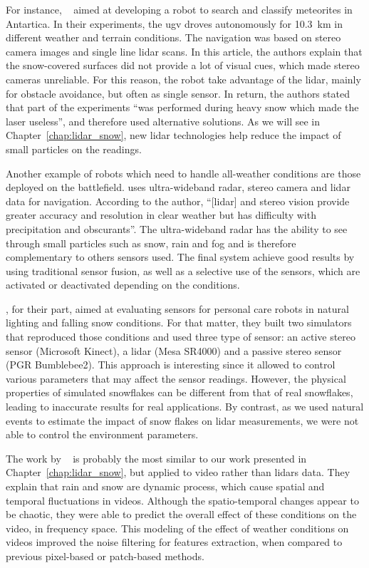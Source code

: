 For instance, ~\citet{Moorehead_1999_2122} aimed at developing a robot to search and classify meteorites in Antartica. In their experiments, the \gls*{ugv} droves autonomously for \SI{10.3}{\kilo\meter} in different weather and terrain conditions. The navigation was based on stereo camera images and single line \gls*{lidar} scans. In this article, the authors explain that the snow-covered surfaces did not provide a lot of visual cues, which made stereo cameras unreliable. For this reason, the robot take advantage of the \gls*{lidar}, mainly for obstacle avoidance, but often as single sensor. In return, the authors stated that part of the experiments \enquote{was performed during heavy snow which made the laser useless}, and therefore used alternative solutions. As we will see in Chapter~\ref{chap:lidar_snow}, new \gls*{lidar} technologies help reduce the impact of small particles on the readings. 

Another example of robots which need to handle all-weather conditions are those deployed on the battlefield. \citet{yamauchi2010fusing} uses ultra-wideband radar, stereo camera and \gls*{lidar} data for navigation. According to the author, \enquote{[\gls*{lidar}] and stereo vision provide greater accuracy and resolution in clear weather but has difficulty with precipitation and obscurants}. The ultra-wideband radar has the ability to see through small particles such as snow, rain and fog and is therefore complementary to others sensors used. The final system achieve good results by using traditional sensor fusion, as well as a selective use of the sensors, which are activated or deactivated depending on the conditions. 

\citet{sumi-arso-13}, for their part, aimed at evaluating sensors for personal care robots in natural lighting and falling snow conditions. For that matter, they built two simulators that reproduced those conditions and used three type of sensor: an active stereo sensor (Microsoft Kinect), a \gls*{lidar} (Mesa SR4000) and a passive stereo sensor (PGR Bumblebee2). This approach is interesting since it allowed to control various parameters that may affect the sensor readings. However, the physical properties of simulated snowflakes can be different from that of real snowflakes, leading to inaccurate results for real applications. By contrast, as we used natural events to estimate the impact of snow flakes on \gls*{lidar} measurements, we were not able to control the environment parameters.

The work by ~\citet{barnum2010analysis} is probably the most similar to our work presented in Chapter~\ref{chap:lidar_snow}, but applied to video rather than \gls*{lidar}s data. They explain that rain and snow are dynamic process, which cause spatial and temporal fluctuations in videos. Although the spatio-temporal changes appear to be chaotic, they were able to predict the overall effect of these conditions on the video, in frequency space. This modeling of the effect of weather conditions on videos improved the noise filtering for features extraction, when compared to previous pixel-based or patch-based methods.


